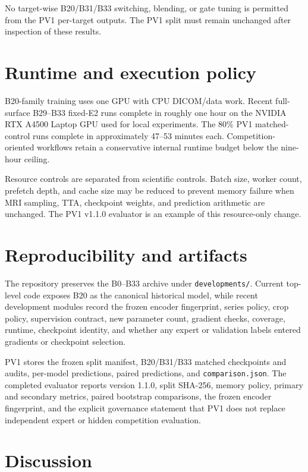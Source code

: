\documentclass[preprint,12pt]{elsarticle}
\newcommand{\code}[1]{\texttt{#1}}
\begin{document}
No target-wise B20/B31/B33 switching, blending, or gate tuning is permitted from the PV1 per-target outputs. The PV1 split must remain unchanged after inspection of these results.

\section{Runtime and execution policy}
\label{sec:runtime}

B20-family training uses one GPU with CPU DICOM/data work. Recent full-surface B29--B33 fixed-E2 runs complete in roughly one hour on the NVIDIA RTX A4500 Laptop GPU used for local experiments. The 80\% PV1 matched-control runs complete in approximately 47--53 minutes each. Competition-oriented workflows retain a conservative internal runtime budget below the nine-hour ceiling.

Resource controls are separated from scientific controls. Batch size, worker count, prefetch depth, and cache size may be reduced to prevent memory failure when MRI sampling, TTA, checkpoint weights, and prediction arithmetic are unchanged. The PV1 v1.1.0 evaluator is an example of this resource-only change.

\section{Reproducibility and artifacts}
\label{sec:reproducibility}

The repository preserves the B0--B33 archive under \code{developments/}. Current top-level code exposes B20 as the canonical historical model, while recent development modules record the frozen encoder fingerprint, series policy, crop policy, supervision contract, new parameter count, gradient checks, coverage, runtime, checkpoint identity, and whether any expert or validation labels entered gradients or checkpoint selection.

PV1 stores the frozen split manifest, B20/B31/B33 matched checkpoints and audits, per-model predictions, paired predictions, and \code{comparison.json}. The completed evaluator reports version 1.1.0, split SHA-256, memory policy, primary and secondary metrics, paired bootstrap comparisons, the frozen encoder fingerprint, and the explicit governance statement that PV1 does not replace independent expert or hidden competition evaluation.

\section{Discussion}
\label{sec:discussion}
\end{document}
